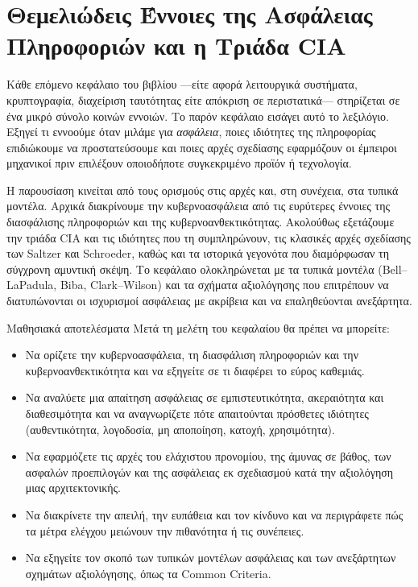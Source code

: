 \chapter{Θεμελιώδεις Έννοιες της Ασφάλειας Πληροφοριών και η Τριάδα CIA}\label{ch:1}

Κάθε επόμενο κεφάλαιο του βιβλίου —είτε αφορά λειτουργικά συστήματα, κρυπτογραφία, διαχείριση ταυτότητας είτε απόκριση σε περιστατικά— στηρίζεται σε ένα μικρό σύνολο κοινών εννοιών. Το παρόν κεφάλαιο εισάγει αυτό το λεξιλόγιο. Εξηγεί τι εννοούμε όταν μιλάμε για \emph{ασφάλεια}, ποιες ιδιότητες της πληροφορίας επιδιώκουμε να προστατεύσουμε και ποιες αρχές σχεδίασης εφαρμόζουν οι έμπειροι μηχανικοί πριν επιλέξουν οποιοδήποτε συγκεκριμένο προϊόν ή τεχνολογία.

Η παρουσίαση κινείται από τους ορισμούς στις αρχές και, στη συνέχεια, στα τυπικά μοντέλα. Αρχικά διακρίνουμε την κυβερνοασφάλεια από τις ευρύτερες έννοιες της διασφάλισης πληροφοριών και της κυβερνοανθεκτικότητας. Ακολούθως εξετάζουμε την τριάδα CIA και τις ιδιότητες που τη συμπληρώνουν, τις κλασικές αρχές σχεδίασης των Saltzer και Schroeder, καθώς και τα ιστορικά γεγονότα που διαμόρφωσαν τη σύγχρονη αμυντική σκέψη. Το κεφάλαιο ολοκληρώνεται με τα τυπικά μοντέλα (Bell–LaPadula, Biba, Clark–Wilson) και τα σχήματα αξιολόγησης που επιτρέπουν να διατυπώνονται οι ισχυρισμοί ασφάλειας με ακρίβεια και να επαληθεύονται ανεξάρτητα.

\begin{outcomesbox}{Μαθησιακά αποτελέσματα}
Μετά τη μελέτη του κεφαλαίου θα πρέπει να μπορείτε:
\begin{itemize}
  \item Να ορίζετε την κυβερνοασφάλεια, τη διασφάλιση πληροφοριών και την κυβερνοανθεκτικότητα και να εξηγείτε σε τι διαφέρει το εύρος καθεμιάς.
  \item Να αναλύετε μια απαίτηση ασφάλειας σε εμπιστευτικότητα, ακεραιότητα και διαθεσιμότητα και να αναγνωρίζετε πότε απαιτούνται πρόσθετες ιδιότητες (αυθεντικότητα, λογοδοσία, μη αποποίηση, κατοχή, χρησιμότητα).
  \item Να εφαρμόζετε τις αρχές του ελάχιστου προνομίου, της άμυνας σε βάθος, των ασφαλών προεπιλογών και της ασφάλειας εκ σχεδιασμού κατά την αξιολόγηση μιας αρχιτεκτονικής.
  \item Να διακρίνετε την απειλή, την ευπάθεια και τον κίνδυνο και να περιγράφετε πώς τα μέτρα ελέγχου μειώνουν την πιθανότητα ή τις συνέπειες.
  \item Να εξηγείτε τον σκοπό των τυπικών μοντέλων ασφάλειας και των ανεξάρτητων σχημάτων αξιολόγησης, όπως τα Common Criteria.
\end{itemize}
\end{outcomesbox}

